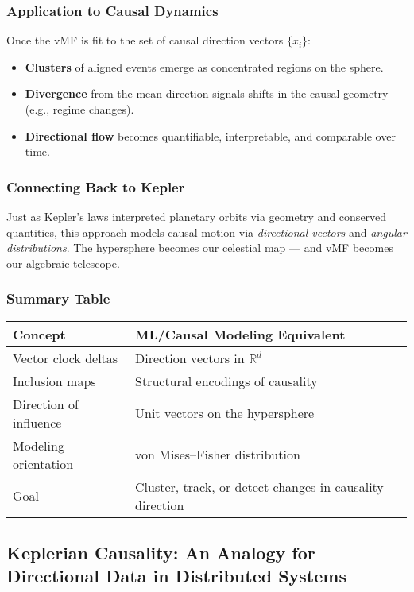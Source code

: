\subsubsection{Application to Causal Dynamics}
Once the vMF is fit to the set of causal direction vectors $\{x_i\}$:
\begin{itemize}
  \item \textbf{Clusters} of aligned events emerge as concentrated regions on the sphere.
  \item \textbf{Divergence} from the mean direction signals shifts in the causal geometry (e.g., regime changes).
  \item \textbf{Directional flow} becomes quantifiable, interpretable, and comparable over time.
\end{itemize}

\subsubsection{Connecting Back to Kepler}
Just as Kepler’s laws interpreted planetary orbits via geometry and conserved quantities, this approach models causal motion via \emph{directional vectors} and \emph{angular distributions}. The hypersphere becomes our celestial map — and vMF becomes our algebraic telescope.

\subsubsection{Summary Table}
\begin{center}
\begin{tabular}{ll}
\toprule
\textbf{Concept} & \textbf{ML/Causal Modeling Equivalent} \\
\midrule
Vector clock deltas & Direction vectors in $\mathbb{R}^d$ \\
Inclusion maps & Structural encodings of causality \\
Direction of influence & Unit vectors on the hypersphere \\
Modeling orientation & von Mises--Fisher distribution \\
Goal & Cluster, track, or detect changes in causality direction \\
\bottomrule
\end{tabular}
\end{center}




\subsection{Keplerian Causality: An Analogy for Directional Data in Distributed Systems}

